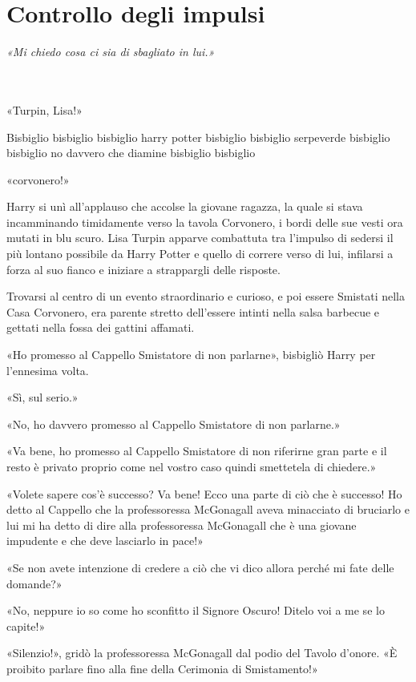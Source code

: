 
\chapter{Controllo degli impulsi}
\label{capitolo:12}

\emph{«Mi chiedo cosa ci sia di sbagliato in lui.»}

~\\
~\\

«Turpin, Lisa!»

Bisbiglio bisbiglio bisbiglio harry potter bisbiglio bisbiglio serpeverde bisbiglio bisbiglio no davvero che diamine bisbiglio bisbiglio

«corvonero!»

Harry si unì all’applauso che accolse la giovane ragazza, la quale si stava incamminando timidamente verso la tavola Corvonero, i bordi delle sue vesti ora mutati in blu scuro. Lisa Turpin apparve combattuta tra l’impulso di sedersi il più lontano possibile da Harry Potter e quello di correre verso di lui, infilarsi a forza al suo fianco e iniziare a strappargli delle risposte.

Trovarsi al centro di un evento straordinario e curioso, e poi essere Smistati nella Casa Corvonero, era parente stretto dell’essere intinti nella salsa barbecue e gettati nella fossa dei gattini affamati.

«Ho promesso al Cappello Smistatore di non parlarne», bisbigliò Harry per l’ennesima volta.

«Sì, sul serio.»

«No, ho davvero promesso al Cappello Smistatore di non parlarne.»

«Va bene, ho promesso al Cappello Smistatore di non riferirne gran parte e il resto è privato proprio come nel vostro caso quindi smettetela di chiedere.»

«Volete sapere cos’è successo? Va bene! Ecco una parte di ciò che è successo! Ho detto al Cappello che la professoressa McGonagall aveva minacciato di bruciarlo e lui mi ha detto di dire alla professoressa McGonagall che è una giovane impudente e che deve lasciarlo in pace!»

«Se non avete intenzione di credere a ciò che vi dico allora perché mi fate delle domande?»

«No, neppure io so come ho sconfitto il Signore Oscuro! Ditelo voi a me se lo capite!»

«Silenzio!», gridò la professoressa McGonagall dal podio del Tavolo d’onore. «È proibito parlare fino alla fine della Cerimonia di Smistamento!»

